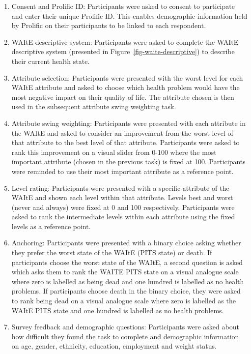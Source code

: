 \documentclass[
  number,
  preprint]{elsarticle}
\providecommand{\tightlist}{%
  \setlength{\itemsep}{0pt}\setlength{\parskip}{0pt}}\usepackage{longtable,booktabs,array}
\begin{document}
\begin{enumerate}
\def\labelenumi{\arabic{enumi}.}
\tightlist
\item
  Consent and Prolific ID: Participants were asked to consent to
  participate and enter their unique Prolific ID. This enables
  demographic information held by Prolific on their participants to be
  linked to each respondent.
\item
  WAItE descriptive system: Participants were asked to complete the
  WAItE descriptive system (presented in
  Figure~\ref{fig-waite-descriptive}) to describe their current health
  state.
\item
  Attribute selection: Participants were presented with the worst level
  for each WAItE attribute and asked to choose which health problem
  would have the most negative impact on their quality of life. The
  attribute chosen is then used in the subsequent attribute swing
  weighting task.
\item
  Attribute swing weighting: Participants were presented with each
  attribute in the WAItE and asked to consider an improvement from the
  worst level of that attribute to the best level of that attribute.
  Participants were asked to rank this improvement on a visual slider
  from 0-100 where the most important attribute (chosen in the previous
  task) is fixed at 100. Participants were reminded to use their most
  important attribute as a reference point.
\item
  Level rating: Participants were presented with a specific attribute of
  the WAItE and shown each level within that attribute. Levels best and
  worst (never and always) were fixed at 0 and 100 respectively.
  Participants were asked to rank the intermediate levels within each
  attribute using the fixed levels as a reference point.
\item
  Anchoring: Participants were presented with a binary choice asking
  whether they prefer the worst state of the WAItE (PITS state) or
  death. If participants choose the worst state of the WAItE, a second
  question is asked which asks them to rank the WAITE PITS state on a
  visual analogue scale where zero is labelled as being dead and one
  hundred is labelled as no health problems. If participants choose
  death in the binary choice, they were asked to rank being dead on a
  visual analogue scale where zero is labelled as the WAItE PITS state
  and one hundred is labelled as no health problems.
\item
  Survey feedback and demographic questions: Participants were asked
  about how difficult they found the task to complete and demographic
  information on age, gender, ethnicity, education, employment and
  weight status.
\end{enumerate}
\end{document}
